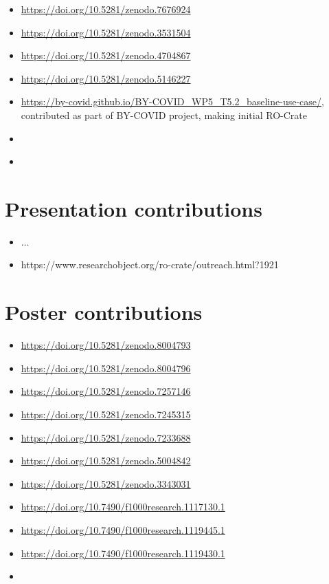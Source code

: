 \begin{itemize}
  \item \url{https://doi.org/10.5281/zenodo.7676924}
  \item \url{https://doi.org/10.5281/zenodo.3531504}
  \item \url{https://doi.org/10.5281/zenodo.4704867} 
  \item \url{https://doi.org/10.5281/zenodo.5146227}
  \item \url{https://by-covid.github.io/BY-COVID_WP5_T5.2_baseline-use-case/}, contributed as part of BY-COVID project, making initial RO-Crate
  \item {} \cite{rocrate1.1}
  \item {}
\end{itemize}

\section{Presentation contributions}
\begin{itemize}

\item ...
  \item https://www.researchobject.org/ro-crate/outreach.html?1921
\end{itemize}

\section{Poster contributions}

\begin{itemize}
  \item \url{https://doi.org/10.5281/zenodo.8004793}
  \item \url{https://doi.org/10.5281/zenodo.8004796}
  \item \url{https://doi.org/10.5281/zenodo.7257146}
  \item \url{https://doi.org/10.5281/zenodo.7245315}
  \item \url{https://doi.org/10.5281/zenodo.7233688}
  \item \url{https://doi.org/10.5281/zenodo.5004842}
  \item \url{https://doi.org/10.5281/zenodo.3343031}
  \item \url{https://doi.org/10.7490/f1000research.1117130.1}
  \item \url{https://doi.org/10.7490/f1000research.1119445.1}
  \item \url{https://doi.org/10.7490/f1000research.1119430.1}
  \item 
\end{itemize}
